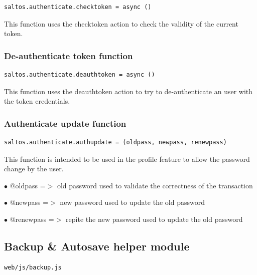\documentclass[a4paper]{article}
\begin{document}
\begin{lstlisting}
saltos.authenticate.checktoken = async ()
\end{lstlisting}

This function uses the checktoken action to check the validity of the current token.

\hypertarget{toc27}{}
\subsubsection{De-authenticate token function}

\begin{lstlisting}
saltos.authenticate.deauthtoken = async ()
\end{lstlisting}

This function uses the deauthtoken action to try to de-authenticate an user with the token
credentials.

\hypertarget{toc28}{}
\subsubsection{Authenticate update function}

\begin{lstlisting}
saltos.authenticate.authupdate = (oldpass, newpass, renewpass)
\end{lstlisting}

This function is intended to be used in the profile feature to allow the password change
by the user.

\begin{compactitem}
\item[\color{myblue}$\bullet$] @oldpass   =$>$ old password used to validate the correctness of the transaction
\item[\color{myblue}$\bullet$] @newpass   =$>$ new password used to update the old password
\item[\color{myblue}$\bullet$] @renewpass =$>$ repite the new password used to update the old password
\end{compactitem}

\hypertarget{toc29}{}
\subsection{Backup \& Autosave helper module}

\begin{lstlisting}
web/js/backup.js
\end{lstlisting}
\end{document}
